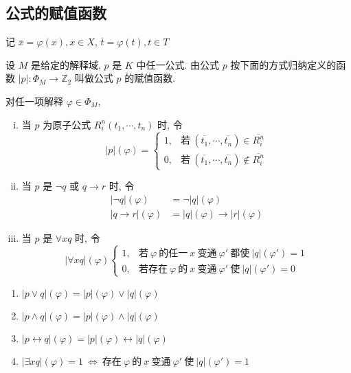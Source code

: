\documentclass[
    mode=hazy,
    color=blue,
    device=normal,
    lang=cn
]{elegantnote}
\begin{document}
\subsection{公式的赋值函数}
记 $\overline{x}=\varphi(x), x\in X$, $\overline{t}=\varphi(t), t\in T$
\begin{definition}[公式的赋值函数]
    设 $M$ 是给定的解释域, $p$ 是 $K$ 中任一公式. 由公式 $p$ 按下面的方式归纳定义的函数 $\lvert p\rvert:\Phi_M\to\mathbb{Z}_2$ 叫做公式 $p$ 的赋值函数.

    对任一项解释 $\varphi\in\Phi_M$,
    \begin{enumerate}[(i)]
        \item 当 $p$ 为原子公式 $R_i^n(t_1, \cdots, t_n)$ 时, 令
        $$
            \lvert p\rvert (\varphi)=
            \begin{cases}
                1, &\text{若}\ (\overline{t_1}, \cdots, \overline{t_n})\in \overline{R_i^n}\\
                0, &\text{若}\ (\overline{t_1}, \cdots, \overline{t_n})\notin \overline{R_i^n}
            \end{cases}
        $$
        \item 当 $p$ 是 $\lnot q$ 或 $q\to r$ 时, 令
        \begin{align*}
            \lvert\lnot q\rvert(\varphi)&=\lnot\lvert q\rvert(\varphi)\\
            \lvert q\to r\rvert(\varphi) &= \lvert q\rvert(\varphi)\to\lvert r\rvert(\varphi)
        \end{align*}
        \item 当 $p$ 是 $\forall xq$ 时, 令
        $$
            \lvert\forall x q\rvert(\varphi)
            \begin{cases}
                1, &\text{若}\ \varphi\ \text{的任一}\ x\ \text{变通}\ \varphi'\ \text{都使}\ \lvert q\rvert(\varphi')=1\\
                0, &\text{若存在}\ \varphi\ \text{的}\ x\ \text{变通}\ \varphi'\ \text{使}\ \lvert q\rvert(\varphi')=0
            \end{cases}
        $$
    \end{enumerate}
\end{definition}
\begin{proposition}
    \hfill
    \begin{enumerate}[label = $\arabic*^\circ$]
        \item $\lvert p\lor q\rvert (\varphi) = \lvert p\rvert (\varphi)\lor \lvert q\rvert (\varphi)$
        \item $\lvert p\land q\rvert (\varphi) = \lvert p\rvert (\varphi)\land \lvert q\rvert (\varphi)$
        \item $\lvert p\leftrightarrow q\rvert (\varphi) = \lvert p\rvert (\varphi)\leftrightarrow \lvert q\rvert (\varphi)$
        \item $\lvert \exists x q\rvert (\varphi) = 1\ \Leftrightarrow\  \text{存在}\ \varphi\ \text{的}\ x\ \text{变通}\ \varphi'\ \text{使}\ \lvert q\rvert(\varphi')=1$
    \end{enumerate}
\end{proposition}
\end{document}
